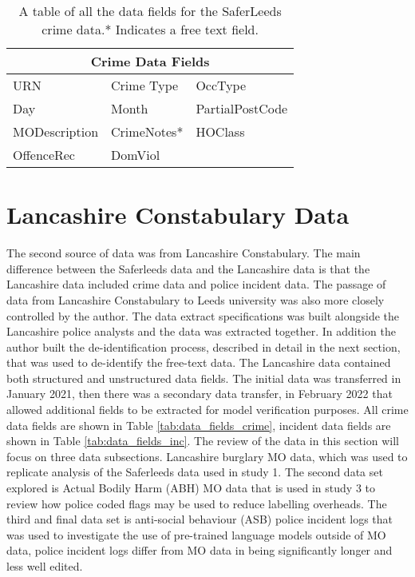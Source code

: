 \begin{table}[]
\centering
\begin{tabular}{@{}lll@{}}
\toprule
\multicolumn{3}{c}{Crime Data Fields}                          \\ \midrule
URN & Crime Type       & OccType      \\
Day           & Month          & PartialPostCode                \\
MODescription & CrimeNotes*             & HOClass            \\
OffenceRec  &  DomViol          &           \\ \bottomrule
\end{tabular}
\caption{\label{tab:data_fields_saferleeds} A table of all the data fields for the SaferLeeds crime data.* Indicates a free text field.}
\end{table}


\section{Lancashire Constabulary Data} The second source of data was from Lancashire Constabulary. The main difference between the Saferleeds data and the Lancashire data is that the Lancashire data included crime data and police incident data. The passage of data from Lancashire Constabulary to Leeds university was also more closely controlled by the author. The data extract specifications was built alongside the Lancashire police analysts and the data was extracted together. In addition the author built the de-identification process, described in detail in the next section, that was used to de-identify the free-text data. The Lancashire data contained both structured and unstructured data fields. The initial data was transferred in January 2021, then there was a secondary data transfer, in February 2022 that allowed additional fields to be extracted for model verification purposes. All crime data fields are shown in Table \ref{tab:data_fields_crime}, incident data fields are shown in Table \ref{tab:data_fields_inc}. The review of the data in this section will focus on three data subsections. Lancashire burglary MO data, which was used to replicate analysis of the Saferleeds data used in study 1. The second data set explored is Actual Bodily Harm (ABH) MO data that is used in study 3 to review how police coded flags may be used to reduce labelling overheads. The third and final data set is anti-social behaviour (ASB) police incident logs that was used to investigate the use of pre-trained language models outside of MO data, police incident logs differ from MO data in being significantly longer and less well edited.  


